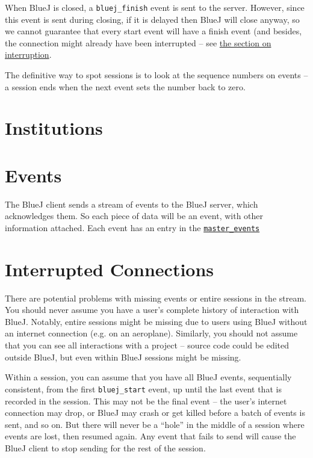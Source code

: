 \documentclass{book}
\begin{document}
When BlueJ is closed, a \texttt{bluej\_finish} event is sent to the server.
However, since this event is sent during closing, if it is delayed then BlueJ
will close anyway, so we cannot guarantee that every start event will have a
finish event (and besides, the connection might already have been interrupted
-- see \hyperref[def:interruption]{the section on interruption}.

The definitive way to spot sessions is to look at the sequence numbers on
events -- a session ends when the next event sets the number back to zero.

\section{Institutions}
\label{def:institution_id}

\section{Events}

The BlueJ client sends a stream of events to the BlueJ server, which
acknowledges them.  So each piece of data will be an event, with other
information attached.  Each event has an entry in the \hyperref[tab:master_events]{\texttt{master\_events}}

\section{Interrupted Connections}
\label{def:interruption}

There are potential problems with missing events or entire sessions in the stream.  You should
never assume you have a user's complete history of interaction with BlueJ.
Notably, entire sessions might be missing due to users using BlueJ without an
internet connection (e.g. on an aeroplane).  Similarly, you should not assume
that you can see all interactions with a project -- source code could be
edited outside BlueJ, but even within BlueJ sessions might be missing.

Within a session, you can assume that you have all BlueJ events, sequentially
consistent, from the first \texttt{bluej\_start} event, up until the last
event that is recorded in the session.  This may not be the final event -- the user's
internet connection may drop, or BlueJ may crash or get killed before a batch of events
is sent, and so on.  But there will never be a ``hole'' in the middle of a
session where events are lost, then resumed again.  Any event that fails to
send will cause the BlueJ client to stop sending for the rest of the session.
\end{document}
